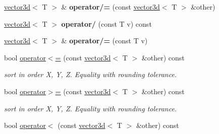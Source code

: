 \begin{DoxyCompactItemize}
\item 
\hyperlink{classirr_1_1core_1_1vector3d}{vector3d}$<$ T $>$ \& {\bfseries operator/=} (const \hyperlink{classirr_1_1core_1_1vector3d}{vector3d}$<$ T $>$ \&other)\hypertarget{classirr_1_1core_1_1vector3d_ab46c94558797997b369cfe0a38c57794}{}\label{classirr_1_1core_1_1vector3d_ab46c94558797997b369cfe0a38c57794}

\item 
\hyperlink{classirr_1_1core_1_1vector3d}{vector3d}$<$ T $>$ {\bfseries operator/} (const T v) const \hypertarget{classirr_1_1core_1_1vector3d_a783084cb15a1a395c54de649544de966}{}\label{classirr_1_1core_1_1vector3d_a783084cb15a1a395c54de649544de966}

\item 
\hyperlink{classirr_1_1core_1_1vector3d}{vector3d}$<$ T $>$ \& {\bfseries operator/=} (const T v)\hypertarget{classirr_1_1core_1_1vector3d_a6b1f864e2316167a8b5a65ca086c11ff}{}\label{classirr_1_1core_1_1vector3d_a6b1f864e2316167a8b5a65ca086c11ff}

\item 
bool \hyperlink{classirr_1_1core_1_1vector3d_ad567b75b65cd2ded2312d41f7a5263da}{operator$<$=} (const \hyperlink{classirr_1_1core_1_1vector3d}{vector3d}$<$ T $>$ \&other) const \hypertarget{classirr_1_1core_1_1vector3d_ad567b75b65cd2ded2312d41f7a5263da}{}\label{classirr_1_1core_1_1vector3d_ad567b75b65cd2ded2312d41f7a5263da}

\begin{DoxyCompactList}\small\item\em sort in order X, Y, Z. Equality with rounding tolerance. \end{DoxyCompactList}\item 
bool \hyperlink{classirr_1_1core_1_1vector3d_ab3c1da2da396a7f2ae336fda985cab6d}{operator$>$=} (const \hyperlink{classirr_1_1core_1_1vector3d}{vector3d}$<$ T $>$ \&other) const \hypertarget{classirr_1_1core_1_1vector3d_ab3c1da2da396a7f2ae336fda985cab6d}{}\label{classirr_1_1core_1_1vector3d_ab3c1da2da396a7f2ae336fda985cab6d}

\begin{DoxyCompactList}\small\item\em sort in order X, Y, Z. Equality with rounding tolerance. \end{DoxyCompactList}\item 
bool \hyperlink{classirr_1_1core_1_1vector3d_a9ce8b1cf82c64f0985cf668056698519}{operator$<$} (const \hyperlink{classirr_1_1core_1_1vector3d}{vector3d}$<$ T $>$ \&other) const \hypertarget{classirr_1_1core_1_1vector3d_a9ce8b1cf82c64f0985cf668056698519}{}\label{classirr_1_1core_1_1vector3d_a9ce8b1cf82c64f0985cf668056698519}


\end{DoxyCompactItemize}
